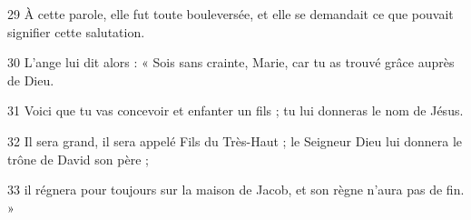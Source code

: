 
29 À cette parole, elle fut toute bouleversée, et elle se demandait ce que pouvait signifier cette salutation.

30 L’ange lui dit alors : « Sois sans crainte, Marie, car tu as trouvé grâce auprès de Dieu.

31 Voici que tu vas concevoir et enfanter un fils ; tu lui donneras le nom de Jésus.

32 Il sera grand, il sera appelé Fils du Très-Haut ; le Seigneur Dieu lui donnera le trône de David son père ;

33 il régnera pour toujours sur la maison de Jacob, et son règne n’aura pas de fin. »
